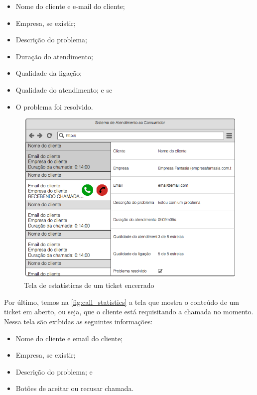 \begin{itemize}
  \item Nome do cliente e e-mail do cliente;
  \item Empresa, se existir;
  \item Descrição do problema;
  \item Duração do atendimento;
  \item Qualidade da ligação;
  \item Qualidade do atendimento; e se
  \item O problema foi resolvido.
\end{itemize}

\begin{figure}[ht!]
	\centering
    \includegraphics[scale=0.4]{figures/ticket-statistics.png} 
	\caption{Tela de estatísticas de um ticket encerrado}
	\label{fig:ticket_statistics}
\end{figure}

Por último, temos na \autoref{fig:call_statistics} a tela que mostra o conteúdo de um ticket em aberto, ou seja, que o cliente está requisitando a chamada no momento. Nessa tela são exibidas as seguintes informações:

\begin{itemize}
	\item Nome do cliente e email do cliente;
    \item Empresa, se existir;
    \item Descrição do problema; e
    \item Botões de aceitar ou recusar chamada.
\end{itemize}

